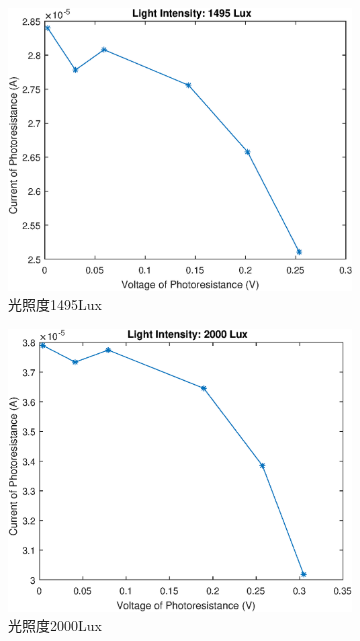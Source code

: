 \documentclass{ctexart}
\begin{document}
\begin{figure}[H]
\begin{subfigure}{.45\textwidth}
    \centering
    \includegraphics[width=\linewidth]{光电传感器综合实验图像/photocell_1495Lux}
    \caption{光照度1495Lux}
  \end{subfigure}
  \begin{subfigure}{.45\textwidth}
    \centering
    \includegraphics[width=\linewidth]{光电传感器综合实验图像/photocell_2000Lux}
    \caption{光照度2000Lux}
  \end{subfigure}
  \begin{subfigure}{.45\textwidth}
    \centering

\end{subfigure}
\end{figure}
\end{document}
